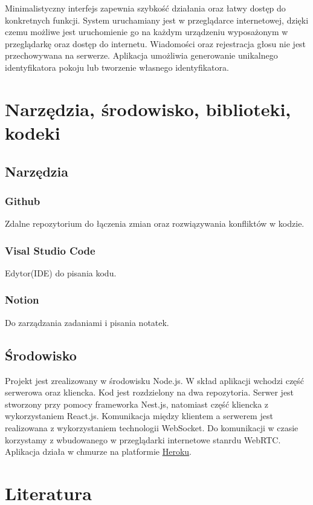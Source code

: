 \documentclass{article}
\begin{document}
Minimalistyczny interfejs zapewnia szybkość działania oraz łatwy dostęp do konkretnych funkcji. System uruchamiany jest w przeglądarce internetowej, dzięki czemu możliwe jest uruchomienie go na każdym urządzeniu wyposażonym w przeglądarkę oraz dostęp do internetu. Wiadomości oraz rejestracja głosu nie jest przechowywana na serwerze. Aplikacja umożliwia generowanie unikalnego identyfikatora pokoju lub tworzenie własnego identyfikatora.

\section{Narzędzia, środowisko, biblioteki, kodeki}

\subsection{Narzędzia}

\subsubsection{Github}
Zdalne repozytorium do łączenia zmian oraz rozwiązywania konfliktów w kodzie.

\subsubsection{Visal Studio Code}
Edytor(IDE) do pisania kodu.

\subsubsection{Notion}
Do zarządzania zadaniami i pisania notatek.

\subsection{Środowisko}
Projekt jest zrealizowany w środowisku Node.js. W skład aplikacji wchodzi część serwerowa oraz kliencka. Kod jest rozdzielony na dwa repozytoria. Serwer jest stworzony przy pomocy frameworka Nest.js, natomiast część kliencka z wykorzystaniem React.js. Komunikacja między klientem a serwerem jest realizowana z wykorzystaniem technologii WebSocket. Do komunikacji w czasie korzystamy z wbudowanego w przeglądarki internetowe stanrdu WebRTC. Aplikacja działa w chmurze na platformie \href{https://dashboard.heroku.com/apps}{Heroku}.

\section{Literatura}
\end{document}

